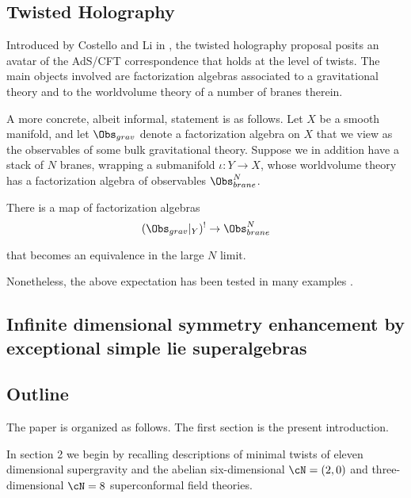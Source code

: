 \subsection{Twisted Holography}
Introduced by Costello and Li in \cite{CLsugra}, the twisted holography proposal posits an avatar of the AdS/CFT correspondence that holds at the level of twists. The main objects involved are factorization algebras associated to a gravitational theory and to the worldvolume theory of a number of branes therein.

A more concrete, albeit informal, statement is as follows. Let $X$ be a smooth manifold, and let $\Obs_{grav}$ denote a factorization algebra on $X$ that we view as the observables of some bulk gravitational theory. Suppose we in addition have a stack of $N$ branes, wrapping a submanifold $\iota: Y\to X$, whose worldvolume theory has a factorization algebra of observables $\Obs^{N}_{brane}$.

\begin{expect}
  There is a map of factorization algebras
  \[
        (\Obs_{grav}|_{Y})^{!}\to \Obs^{N}_{brane}
  \]

      that becomes an equivalence in the large $N$ limit.
\end{expect}



Nonetheless, the above expectation has been tested in many examples \cite{}.


\subsection{Infinite dimensional symmetry enhancement by exceptional simple lie superalgebras}

\subsection{Outline}

The paper is organized as follows. The first section is the present introduction.

In section 2 we begin by recalling descriptions of minimal twists of eleven dimensional supergravity \cite{} and the abelian six-dimensional $\cN=(2,0)$ \cite{} and three-dimensional $\cN=8$ \cite{} superconformal field theories.

%
